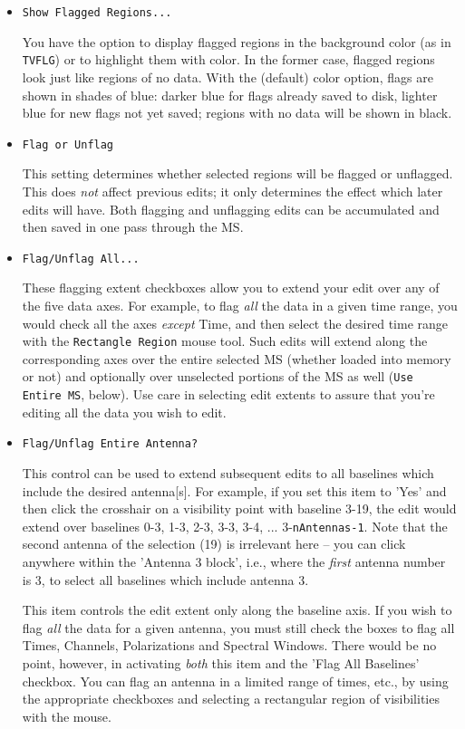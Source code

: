 \begin{itemize}

\item {\tt Show Flagged Regions...}

You have the option to display flagged regions in the background
color (as in {\tt TVFLG}) or to highlight them with color.
In the former case, flagged regions look just like regions of no
data.  With the (default) color option, flags are shown in shades of blue:
darker blue for flags already saved to disk, lighter blue for
new flags not yet saved; regions with no data will be shown in black.

\item {\tt Flag or Unflag}

This setting determines whether selected regions will be flagged or
unflagged.  This does {\it not} affect previous
edits; it only determines the effect which later edits
will have.  Both flagging and unflagging edits can be accumulated
and then saved in one pass through the MS.

\item {\tt Flag/Unflag All...}

These flagging extent checkboxes allow you to extend your edit over any
of the five data axes.  For example, to flag {\it all} the data in a given
time range, you would check all the axes {\it except} Time, and then
select the desired time range with the {\tt Rectangle Region} mouse tool.
Such edits will extend along the corresponding axes over the entire selected
MS (whether loaded into memory or not) and optionally over unselected 
portions of the MS as well ({\tt Use Entire MS}, below).  Use care in
selecting edit extents to assure that you're editing all
the data you wish to edit.

\item {\tt Flag/Unflag Entire Antenna?}

This control can be used to extend subsequent edits to all baselines
which include the desired antenna[s].  For example, if you set this item
to 'Yes' and then click the crosshair on a visibility point with
baseline 3-19, the edit would extend over baselines 0-3, 1-3, 2-3, 3-3,
3-4, ... 3-{\tt nAntennas-1}.  Note that the second antenna of the selection
(19) is irrelevant here -- you can click anywhere within the 'Antenna 3 block',
i.e., where the {\em first} antenna number is 3, to select all baselines
which include antenna 3.

This item controls the edit extent only along the baseline axis.  If you
wish to flag {\it all} the data for a given antenna, you must still check
the boxes to flag all Times, Channels, Polarizations and Spectral Windows.
There would be no point, however, in activating {\it both} this item and
the 'Flag All Baselines' checkbox.  You can flag an antenna in a limited
range of times, etc., by using the appropriate checkboxes and selecting
a rectangular region of visibilities with the mouse. 


\end{itemize}
